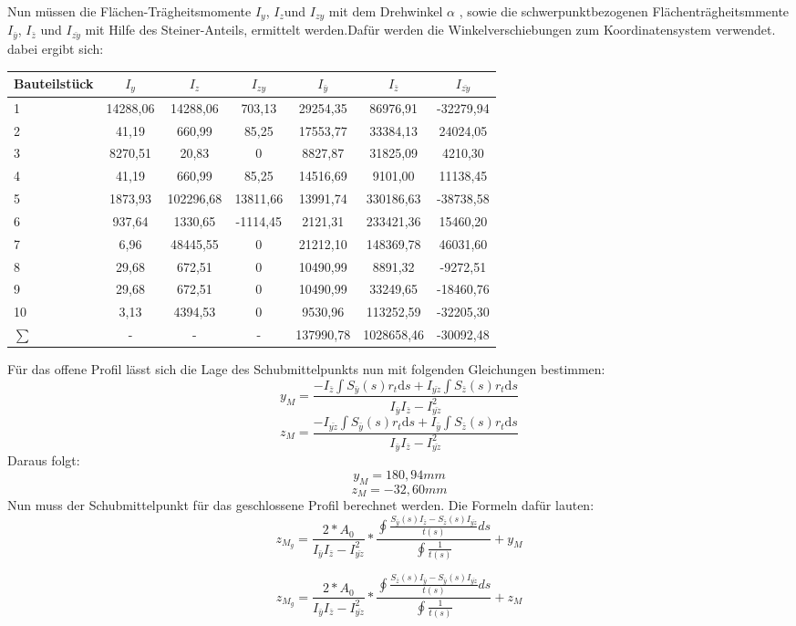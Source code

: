 Nun müssen die Flächen-Trägheitsmomente $I_{y}$, $I_{z}$und $I_{zy}$ mit dem Drehwinkel $\alpha$ , sowie die schwerpunktbezogenen Flächenträgheitsmmente $I_{\bar{y}}$, $I_{\bar{z}}$ und $I_{\bar{zy}}$ mit Hilfe des Steiner-Anteils, ermittelt werden.Dafür werden die Winkelverschiebungen zum Koordinatensystem verwendet.
dabei ergibt sich:
\begin{center}

\begin{tabular}[h]{l|c|c|c||c|c|c}
Bauteilstück&$I_{y}$&$I_{z}$&$I_{zy}$&$I_{\bar{y}}$&$I_{\bar{z}}$&$I_{\bar{zy}}$\\
\hline
1&14288,06&14288,06&703,13&29254,35&86976,91&-32279,94\\
2&41,19&660,99&85,25&17553,77&33384,13&24024,05\\
3&8270,51&20,83&0&8827,87&31825,09&4210,30\\
4&41,19&660,99&85,25&14516,69&9101,00&11138,45\\
5&1873,93&102296,68&13811,66&13991,74&330186,63&-38738,58\\
6&937,64&1330,65&-1114,45&2121,31&233421,36&15460,20\\
7&6,96&48445,55&0&21212,10&148369,78&46031,60\\
8&29,68&672,51&0&10490,99&8891,32&-9272,51\\
9&29,68&672,51&0&10490,99&33249,65&-18460,76\\
10&3,13&4394,53&0&9530,96&113252,59&-32205,30\\
\hline
$\sum{}$&-&-&-&137990,78&1028658,46&-30092,48
\end{tabular}
\end{center}
Für das offene Profil lässt sich die Lage des Schubmittelpunkts nun mit folgenden Gleichungen bestimmen:
$$y_{M}=\frac{-I_{\bar{z}}\int S_{\bar{y}}(s) r_{t}\mathrm{d}s+I_{\bar{yz}}\int S_{\bar{z}}(s) r_{t}\mathrm{d}s}{I_{\bar{y}}I_{\bar{z}}-I_{\bar{yz}}^2}$$
$$z_{M}=\frac{-I_{\bar{yz}}\int S_{\bar{y}}(s) r_{t}\mathrm{d}s+I_{\bar{y}}\int S_{\bar{z}}(s) r_{t}\mathrm{d}s}{I_{\bar{y}}I_{\bar{z}}-I_{\bar{yz}}^2}$$
Daraus folgt:
$$y_{M}=180,94mm$$
$$z_{M}=-32,60mm$$
Nun muss der Schubmittelpunkt für das geschlossene Profil berechnet werden. Die Formeln dafür lauten:
$$ z_{M_{g}}=
\frac{2*A_{0}}{I_{\bar{y}}I_{\bar{z}}-I_{\bar{yz}}^2}
*\frac{
\oint
\frac{
S_{\bar{y}}(s)I_{\bar{z}}-S_{\bar{z}}(s)I_{\bar{yz}}
}
{t(s)} ds
}
{\oint\frac{1}{t(s)}} +y_{M} $$

$$ z_{M_{g}}=
\frac{2*A_{0}}{I_{\bar{y}}I_{\bar{z}}-I_{\bar{yz}}^2}
*\frac{
\oint
\frac{
S_{\bar{z}}(s)I_{\bar{y}}-S_{\bar{y}}(s)I_{\bar{yz}}
}
{t(s)} ds
}
{\oint\frac{1}{t(s)}} +z_{M} $$

